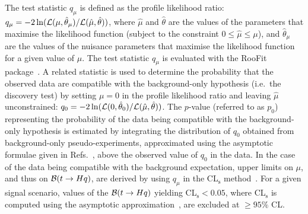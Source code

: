 The test statistic $q_\mu$ is defined as the profile likelihood ratio: 
$q_\mu = -2\ln({\cal L}(\mu,{\hat{\theta}}_\mu)/{\cal L}(\hat{\mu},\hat{\theta}))$,
where $\hat{\mu}$ and $\hat{\theta}$ are the values of the parameters that
maximise the likelihood function (subject to the constraint $0\leq \hat{\mu} \leq \mu$), and ${\hat{\theta}}_\mu$ are the values of the
nuisance parameters that maximise the likelihood function for a given value of $\mu$. 
The test statistic $q_\mu$ is evaluated with the {\textsc RooFit} package~\cite{Verkerke:2003ir,RooFitManual}.
A related statistic is used to determine the probability that the observed data are compatible with the background-only hypothesis (i.e.~the discovery test)  
by setting $\mu=0$ in the profile likelihood ratio and leaving $\hat{\mu}$ unconstrained: $q_0 = -2\ln({\cal L}(0,{\hat{\theta}}_0)/{\cal L}(\hat{\mu},\hat{\theta}))$.
The $p$-value (referred to as $p_0$) representing the probability of the data being compatible with the 
background-only hypothesis is estimated by integrating
the distribution of $q_0$ obtained from background-only pseudo-experiments, approximated using the asymptotic formulae given in Refs.~\cite{Cowan:2010js,ErratumCowan:2010js}, above the observed value of $q_0$ in the data. 
In the case of the data being compatible with the background expectation, upper limits on $\mu$, and thus on 
$\mathcal{B}(t\to Hq)$, are derived by using $q_\mu$ in the CL$_{\textrm{s}}$ method~\cite{Junk:1999kv,Read:2002hq}.
For a given signal scenario, values of the $\mathcal{B}(t\to Hq)$ yielding CL$_{\textrm{s}} < 0.05$, 
where CL$_{\textrm{s}}$ is computed using the asymptotic approximation~\cite{Cowan:2010js,ErratumCowan:2010js}, are excluded at $\geq 95\%$ CL.


